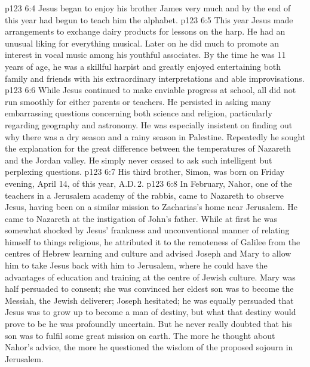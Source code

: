 \vs p123 6:4 Jesus began to enjoy his brother James very much and by the end of this year had begun to teach him the alphabet.
\vs p123 6:5 This year Jesus made arrangements to exchange dairy products for lessons on the harp. He had an unusual liking for everything musical. Later on he did much to promote an interest in vocal music among his youthful associates. By the time he was 11 years of age, he was a skillful harpist and greatly enjoyed entertaining both family and friends with his extraordinary interpretations and able improvisations.
\vs p123 6:6 While Jesus continued to make enviable progress at school, all did not run smoothly for either parents or teachers. He persisted in asking many embarrassing questions concerning both science and religion, particularly regarding geography and astronomy. He was especially insistent on finding out why there was a dry season and a rainy season in Palestine. Repeatedly he sought the explanation for the great difference between the temperatures of Nazareth and the Jordan valley. He simply never ceased to ask such intelligent but perplexing questions.
\vs p123 6:7 \pc His third brother, Simon, was born on Friday evening, April 14, of this year, A.D.\,2.
\vs p123 6:8 \pc In February, Nahor, one of the teachers in a Jerusalem academy of the rabbis, came to Nazareth to observe Jesus, having been on a similar mission to Zacharias’s home near Jerusalem. He came to Nazareth at the instigation of John’s father. While at first he was somewhat shocked by Jesus’ frankness and unconventional manner of relating himself to things religious, he attributed it to the remoteness of Galilee from the centres of Hebrew learning and culture and advised Joseph and Mary to allow him to take Jesus back with him to Jerusalem, where he could have the advantages of education and training at the centre of Jewish culture. Mary was half persuaded to consent; she was convinced her eldest son was to become the Messiah, the Jewish deliverer; Joseph hesitated; he was equally persuaded that Jesus was to grow up to become a man of destiny, but what that destiny would prove to be he was profoundly uncertain. But he never really doubted that his son was to fulfil some great mission on earth. The more he thought about Nahor’s advice, the more he questioned the wisdom of the proposed sojourn in Jerusalem.
